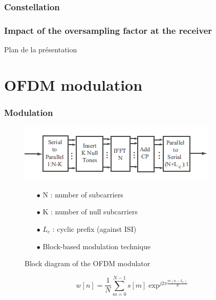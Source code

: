 \documentclass[11pt]{beamer}
\begin{document}
\subsubsection{Constellation}

\begin{frame}
\frametitle{Impact of the oversampling factor at the receiver}


\end{frame}

{
	\begin{frame}[noframenumbering]{Plan de la présentation}
		\tableofcontents
	\end{frame}
}

\section{OFDM modulation}
\begin{frame}
\frametitle{Modulation}

\begin{figure}[!ht]
    \begin{minipage}[b]{0.48\linewidth}
        \centering \includegraphics[scale=0.6]{img/OFDDM_modulator.png}
     \caption{Block diagram of the OFDM modulator}
     \label{fig2}
    \end{minipage}\hfill
    \begin{minipage}[b]{0.48\linewidth}  
    \centering  
    \begin{itemize}
    \item[$\bullet$] N : number of subcarriers
    \item[$\bullet$] K : number of null subcarriers
    \item[$\bullet$] $L_c$ : cyclic prefix (against ISI)
    \item[$\bullet$] Block-based modulation technique
    \end{itemize}
        
    \end{minipage}
\end{figure}
\begin{equation}
w[n]=\frac{1}{N} \sum_{m=0}^{N-1} s[m]\exp^{j2\pi\frac{m(n-L_c)}{N}}
\end{equation}
\end{frame}
\end{document}

